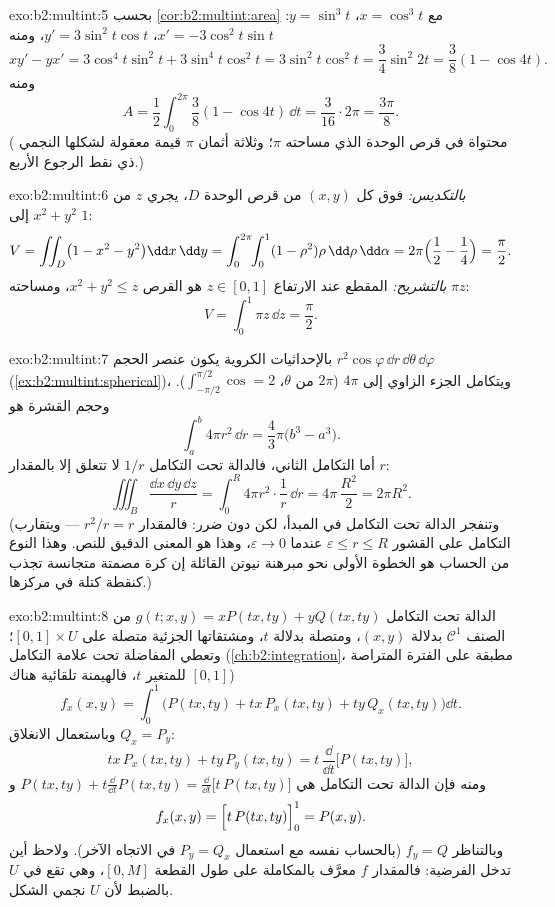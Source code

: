 \begin{solution}{exo:b2:multint:5}
بحسب \cref{cor:b2:multint:area} مع $x = \cos^3 t$، $y = \sin^3 t$: $x' = -3\cos^2 t\sin t$، $y' = 3\sin^2 t\cos t$، ومنه
\[
xy' - yx' = 3\cos^4 t\sin^2 t + 3\sin^4 t\cos^2 t
= 3\sin^2 t\cos^2 t = \frac{3}{4}\sin^2 2t
= \frac{3}{8}(1 - \cos 4t) .
\]
ومنه
\[
A = \frac12\int_0^{2\pi}\frac38(1 - \cos 4t)\,\dd t
= \frac{3}{16}\cdot 2\pi = \frac{3\pi}{8} .
\]
( محتواة في قرص الوحدة الذي مساحته $\pi$؛ وثلاثة أثمان
$\pi$ قيمة معقولة لشكلها النجمي ذي نقط الرجوع الأربع.)
\end{solution}

\begin{solution}{exo:b2:multint:6}
\emph{بالتكديس:} فوق كل $(x, y)$ من قرص الوحدة $D$، يجري $z$ من
$x^2 + y^2$ إلى $1$:
\[
V = \iint_D \bigl(1 - x^2 - y^2\bigr)\dd x\,\dd y
= \int_0^{2\pi}\!\!\int_0^1 (1 - \rho^2)\rho\,\dd\rho\,\dd\alpha
= 2\pi\Bigl(\frac12 - \frac14\Bigr) = \frac\pi2 .
\]
\emph{بالتشريح:} المقطع عند الارتفاع $z \in [0, 1]$ هو القرص $x^2 + y^2 \leq z$، ومساحته
$\pi z$:
\[
V = \int_0^1 \pi z\,\dd z = \frac\pi2 .
\]
\end{solution}

\begin{solution}{exo:b2:multint:7}
بالإحداثيات الكروية يكون عنصر الحجم
$r^2\cos\varphi\,\dd r\,\dd\theta\,\dd\varphi$
(\cref{ex:b2:multint:spherical})، ويتكامل الجزء الزاوي إلى $4\pi$ ($2\pi$ من $\theta$، $\int_{-\pi/2}^{\pi/2}\cos = 2$).
وحجم القشرة هو
\[
\int_a^b 4\pi r^2\,\dd r = \frac43\pi\bigl(b^3 - a^3\bigr).
\]
أما التكامل الثاني، فالدالة تحت التكامل $1/r$ لا تتعلق إلا بالمقدار
$r$:
\[
\iiint_B \frac{\dd x\,\dd y\,\dd z}{r}
= \int_0^R 4\pi r^2\cdot\frac1r\,\dd r
= 4\pi\,\frac{R^2}{2} = 2\pi R^2 .
\]
(وتنفجر الدالة تحت التكامل في المبدأ، لكن دون ضرر: فالمقدار $r^2/r = r$
 --- ويتقارب التكامل على القشور $\varepsilon \leq r
\leq R$ عندما $\varepsilon \to 0$، وهذا هو
المعنى الدقيق للنص. وهذا النوع من الحساب هو الخطوة الأولى نحو مبرهنة
نيوتن القائلة إن كرة مصمتة متجانسة تجذب كنقطة كتلة في مركزها.)
\end{solution}

\begin{solution}{exo:b2:multint:8}
الدالة تحت التكامل $g(t; x, y) = xP(tx, ty) + yQ(tx, ty)$ من الصنف $\mathcal{C}^1$ بدلالة $(x, y)$، ومتصلة
بدلالة $t$، ومشتقاتها الجزئية متصلة على $[0,1] \times U$؛ وتعطي المفاضلة
تحت علامة التكامل (\cref{ch:b2:integration}، مطبقة على الفترة المتراصة $[0,1]$ للمتغير
$t$، فالهيمنة تلقائية هناك)
\[
f_x(x, y)
= \int_0^1 \bigl(P(tx, ty) + tx\,P_x(tx, ty)
+ ty\,Q_x(tx, ty)\bigr)\dd t .
\]
وباستعمال الانغلاق $Q_x = P_y$:
\[
tx\,P_x(tx, ty) + ty\,P_y(tx, ty)
= t\,\frac{\dd}{\dd t}\bigl[P(tx, ty)\bigr] ,
\]
ومنه فإن الدالة تحت التكامل هي $P(tx, ty) + t\frac{\dd}{\dd t}P(tx, ty) =
\frac{\dd}{\dd t}\bigl[t\,P(tx, ty)\bigr]$ و
\[
f_x(x, y) = \Bigl[t\,P(tx, ty)\Bigr]_0^1 = P(x, y) .
\]
وبالتناظر $f_y = Q$ (بالحساب نفسه مع استعمال $P_y = Q_x$ في الاتجاه الآخر).
ولاحظ أين تدخل الفرضية: فالمقدار $f$ معرَّف بالمكاملة على طول
القطعة $[0, M]$، وهي تقع في $U$ بالضبط لأن $U$ نجمي الشكل.
\end{solution}

